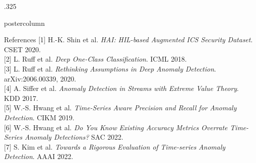 \documentclass{beamer}
\begin{document}
\begin{frame}
\begin{columns}
\begin{column}{.325\textwidth}
\begin{beamercolorbox}[center]{postercolumn}
\begin{minipage}{.98\textwidth}
{\begin{myblock}{References}
{\small
[1] H.-K. Shin et al. \emph{HAI: HIL-based Augmented ICS Security Dataset}. CSET 2020.\\{}
[2] L. Ruff et al. \emph{Deep One-Class Classification}. ICML 2018.\\{}
[3] L. Ruff et al. \emph{Rethinking Assumptions in Deep Anomaly Detection}. arXiv:2006.00339, 2020.\\{}
[4] A. Siffer et al. \emph{Anomaly Detection in Streams with Extreme Value Theory}. KDD 2017.\\{}
[5] W.-S. Hwang et al. \emph{Time-Series Aware Precision and Recall for Anomaly Detection}. CIKM 2019.\\{}
[6] W.-S. Hwang et al. \emph{Do You Know Existing Accuracy Metrics Overrate Time-Series Anomaly Detections?} SAC 2022.\\{}
[7] S. Kim et al. \emph{Towards a Rigorous Evaluation of Time-series Anomaly Detection}. AAAI 2022.
}
\end{myblock}

}\end{minipage}\end{beamercolorbox}
\end{column}

\end{columns}
\end{frame}
\end{document}
